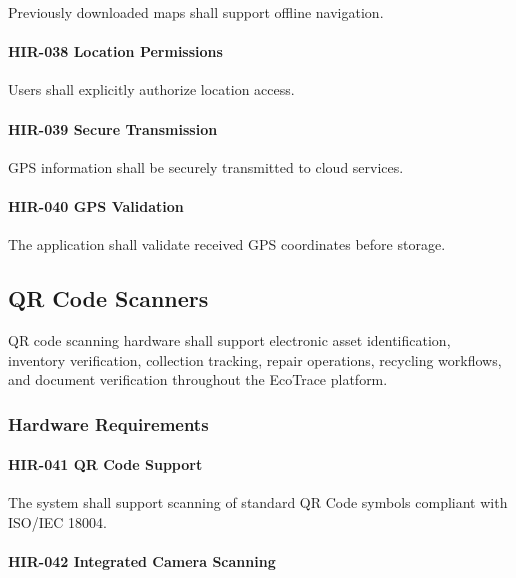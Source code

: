 Previously downloaded maps shall support offline navigation.

\paragraph{HIR-038 Location Permissions}

Users shall explicitly authorize location access.

\paragraph{HIR-039 Secure Transmission}

GPS information shall be securely transmitted to cloud services.

\paragraph{HIR-040 GPS Validation}

The application shall validate received GPS coordinates before storage.


\subsection{QR Code Scanners}

QR code scanning hardware shall support electronic asset
identification, inventory verification, collection tracking, repair
operations, recycling workflows, and document verification throughout
the EcoTrace platform.


\subsubsection*{Hardware Requirements}

\paragraph{HIR-041 QR Code Support}

The system shall support scanning of standard QR Code symbols compliant
with ISO/IEC 18004.

\paragraph{HIR-042 Integrated Camera Scanning}

